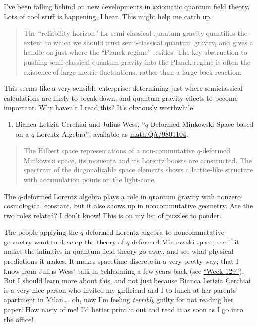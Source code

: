 \documentclass{article}
\def\tightlist{}
\renewcommand{\texttt}[1]{%
  \begingroup
  \ttfamily
  \begingroup\lccode`~=`/\lowercase{\endgroup\def~}{/\discretionary{}{}{}}%
  \begingroup\lccode`~=`[\lowercase{\endgroup\def~}{[\discretionary{}{}{}}%
  \begingroup\lccode`~=`.\lowercase{\endgroup\def~}{.\discretionary{}{}{}}%
  \catcode`/=\active\catcode`[=\active\catcode`.=\active
  \scantokens{#1\noexpand}%
  \endgroup
}
\begin{document}
I've been falling behind on new developments in axiomatic quantum field
theory. Lots of cool stuff is happening, I hear. This might help me
catch up.


\begin{quote}
The ``reliability horizon'' for semi-classical quantum gravity
quantifies the extent to which we should trust semi-classical quantum
gravity, and gives a handle on just where the ``Planck regime'' resides.
The key obstruction to pushing semi-classical quantum gravity into the
Planck regime is often the existence of large metric fluctuations,
rather than a large back-reaction.
\end{quote}

This seems like a very sensible enterprise: determining just where
semiclassical calculations are likely to break down, and quantum gravity
effects to become important. Why haven't I read this? It's obviously
worthwhile!

\begin{enumerate}
\def\labelenumi{\arabic{enumi})}
\setcounter{enumi}{6}
\tightlist
\item
  Bianca Letizia Cerchiai and Julius Wess, ``\(q\)-Deformed Minkowski
  Space based on a \(q\)-Lorentz Algebra'', available as
  \href{https://arxiv.org/abs/math.QA/9801104}{math.QA/9801104}.
\end{enumerate}

\begin{quote}
The Hilbert space representations of a non-commutative \(q\)-deformed
Minkowski space, its momenta and its Lorentz boosts are constructed. The
spectrum of the diagonalizable space elements shows a lattice-like
structure with accumulation points on the light-cone.
\end{quote}

The \(q\)-deformed Lorentz algebra plays a role in quantum gravity with
nonzero cosmological constant, but it also shows up in noncommutative
geometry. Are the two roles related? I don't know! This is on my list of
puzzles to ponder.

The people applying the \(q\)-deformed Lorentz algebra to noncommutative
geometry want to develop the theory of \(q\)-deformed Minkowski space,
see if it makes the infinities in quantum field theory go away, and see
what physical predictions it makes. It makes spacetime discrete in a
very pretty way; that I know from Julius Wess' talk in Schladming a few
years back (see \protect\hyperlink{week129}{``Week 129''}). But I should
learn more about this, and not just because Bianca Letizia Cerchiai is a
very nice person who invited my girlfriend and I to lunch at her
parents' apartment in Milan\ldots. oh, now I'm feeling \emph{terribly}
guilty for not reading her paper! How nasty of me! I'd better print it
out and read it as soon as I go into the office!
\end{document}
